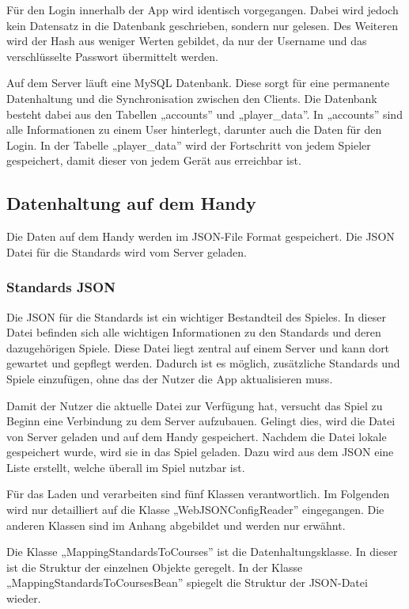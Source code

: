 			Für den Login innerhalb der App wird identisch vorgegangen. Dabei wird jedoch kein Datensatz in die Datenbank geschrieben, sondern nur gelesen. Des Weiteren wird der Hash aus weniger Werten gebildet, da nur der Username und das verschlüsselte Passwort übermittelt werden.
			
			Auf dem Server läuft eine MySQL Datenbank. Diese sorgt für eine permanente Datenhaltung und die Synchronisation zwischen den Clients. Die Datenbank besteht dabei aus den Tabellen „accounts” und „player\_data”. In „accounts” sind alle Informationen zu einem User hinterlegt, darunter auch die Daten für den Login. In der Tabelle „player\_data” wird der Fortschritt von jedem Spieler gespeichert, damit dieser von jedem Gerät aus erreichbar ist.

		\subsection{Datenhaltung auf dem Handy}
		
			Die Daten auf dem Handy werden im \ac{JSON}-File Format gespeichert. Die \ac{JSON} Datei für die Standards wird vom Server geladen.

			\subsubsection{Standards \ac{JSON}}
				Die \ac{JSON} für die Standards ist ein wichtiger Bestandteil des Spieles. In dieser Datei befinden sich alle wichtigen Informationen zu den Standards und deren dazugehörigen Spiele. Diese Datei liegt zentral auf einem Server und kann dort gewartet und gepflegt werden. Dadurch ist es möglich, zusätzliche Standards und Spiele einzufügen, ohne das der Nutzer die App aktualisieren muss.

				Damit der Nutzer die aktuelle Datei zur Verfügung hat, versucht das Spiel zu Beginn eine Verbindung zu dem Server aufzubauen. Gelingt dies, wird die Datei von Server geladen und auf dem Handy gespeichert. Nachdem die Datei lokale gespeichert wurde, wird sie in das Spiel geladen. Dazu wird aus dem \ac{JSON} eine Liste erstellt, welche überall im Spiel nutzbar ist.

				Für das Laden und verarbeiten sind fünf Klassen verantwortlich. Im Folgenden wird nur detailliert auf die Klasse „WebJSONConfigReader” eingegangen. Die anderen Klassen sind im Anhang abgebildet und werden nur erwähnt.

				Die Klasse „MappingStandardsToCourses” ist die Datenhaltungsklasse. In dieser ist die Struktur der einzelnen Objekte geregelt. In der Klasse „MappingStandardsToCoursesBean” spiegelt die Struktur der \ac{JSON}-Datei wieder. 


